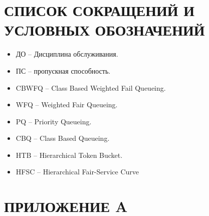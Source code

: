\documentclass[14pt, a4paper] {extarticle}
\newcommand{\includecode}[3]{}
\begin{document}
    \setcounter{figure}{0}
    \newcommand{\mc}[0]{\makecell}
    \newcommand\setrow[1]{\gdef\rowmac{#1}#1\ignorespaces}
    \newcommand\clearrow{\global\let\rowmac\relax}
    \clearrow
    \setcounter{page}{3}

   \tableofcontents

	\newpage
	


	\newpage
	


	\newpage
	

	\newpage
	

	\newpage
	

	\newpage
    \renewcommand{\refname}{СПИСОК ИСПОЛЬЗОВАННЫХ ИСТОЧНИКОВ}
    
 
	\newpage
    \section*{СПИСОК СОКРАЩЕНИЙ И УСЛОВНЫХ ОБОЗНАЧЕНИЙ}

    \begin{itemize}
		\item ДО -- Дисциплина обслуживания.
		\item ПС -- пропускная способность.
    	\item CBWFQ -- Class Based Weighted Fail Queueing.
		\item WFQ -- Weighted Fair Queueing.
		\item PQ -- Priority Queueing.
		\item CBQ -- Class Based Queueing.
		\item HTB --  Hierarchical Token Bucket.
		\item HFSC -- Hierarchical Fair-Service Curve 
    \end{itemize}

	\newpage
    \section*{ПРИЛОЖЕНИЕ A}
        \includecode{c}{code/pkt_sched.diff}{Патч для заголовочного файла pkt\_sched.h.}
\end{document}
